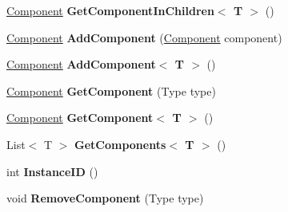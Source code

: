 \begin{DoxyCompactItemize}
\mbox{\hyperlink{class_ecs_1_1_component}{Component}} {\bfseries Get\+Component\+In\+Children$<$ T $>$} ()
\item 
\mbox{\label{class_ecs_1_1_game_object_abd178dde2e08b0f148ea06907a0b1302}} 
\mbox{\hyperlink{class_ecs_1_1_component}{Component}} {\bfseries Add\+Component} (\mbox{\hyperlink{class_ecs_1_1_component}{Component}} component)
\item 
\mbox{\label{class_ecs_1_1_game_object_a4d12d7a0f391cb4aa44626df35e9882f}} 
\mbox{\hyperlink{class_ecs_1_1_component}{Component}} {\bfseries Add\+Component$<$ T $>$} ()
\item 
\mbox{\label{class_ecs_1_1_game_object_a4263f0a68ee23088b4a7f90a7c24a22a}} 
\mbox{\hyperlink{class_ecs_1_1_component}{Component}} {\bfseries Get\+Component} (Type type)
\item 
\mbox{\label{class_ecs_1_1_game_object_a46994a68c1d374811e04fa655b004102}} 
\mbox{\hyperlink{class_ecs_1_1_component}{Component}} {\bfseries Get\+Component$<$ T $>$} ()
\item 
\mbox{\label{class_ecs_1_1_game_object_a7387d9144b92e309ea77f56760bfb31c}} 
List$<$ T $>$ {\bfseries Get\+Components$<$ T $>$} ()
\item 
\mbox{\label{class_ecs_1_1_game_object_a15d93c3cdc874773daf66282c6e55f8c}} 
int {\bfseries Instance\+ID} ()
\item 
\mbox{\label{class_ecs_1_1_game_object_a79994c0a1e6d1b03f9ef48eeb1803385}} 
void {\bfseries Remove\+Component} (Type type)
\end{DoxyCompactItemize}
